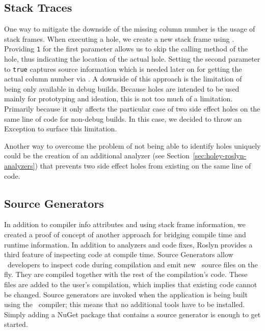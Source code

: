 \subsection{Stack Traces}
\label{sec:holey-stack-traces}
One way to mitigate the downside of the missing column number is the usage of stack frames.
When executing a hole, we create a new stack frame using \texttt{}.
Providing \verb|1| for the first parameter allows us to skip the calling method of the hole, thus indicating the location of the actual hole.
Setting the second parameter to \verb|true| captures source information which is needed later on for getting the actual column number via \texttt{}.
A downside of this approach is the limitation of being only available in debug builds.
Because holes are intended to be used mainly for prototyping and ideation, this is not too much of a limitation.
Primarily because it only affects the particular case of two side effect holes on the same line of code for non-debug builds.
In this case, we decided to throw an Exception to surface this limitation.

Another way to overcome the problem of not being able to identify holes uniquely could be the creation of an additional analyzer (see Section~\ref{sec:holey-roslyn-analyzers}) that prevents two side effect holes from existing on the same line of code.


\subsection{Source Generators}
\label{sec:source-generators}
In addition to compiler info attributes and using stack frame information, we created a proof of concept of another approach for bridging compile time and runtime information.
In addition to analyzers and code fixes, Roslyn provides a third feature of inspecting code at compile time.
Source Generators \cite{microsoft_source_2023} allow \CS\ developers to inspect code during compilation and emit new \CS\ source files on the fly.
They are compiled together with the rest of the compilation's code.
These files are added to the user's compilation, which implies that existing code cannot be changed.
Source generators are invoked when the application is being built using the \CS\ compiler; this means that no additional tools have to be installed.
Simply adding a NuGet package that contains a source generator is enough to get started. 


